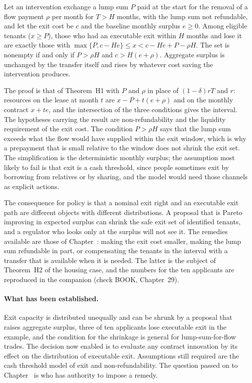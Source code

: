 \begin{proposition}\label{prop:P28gen}
Let an intervention exchange a lump sum $P$ paid at the start for the removal of a flow payment $\rho$ per month for $T>H$ months, with the lump sum not refundable, and let the exit cost be $c$ and the baseline monthly surplus $e\ge 0$. Among eligible tenants ($x\ge P$), those who had an executable exit within $H$ months and lose it are exactly those with $\max\{P,c-He\}\le x<c-He+P-\rho H$. The set is nonempty if and only if $P>\rho H$ and $c>H(e+\rho)$. Aggregate surplus is unchanged by the transfer itself and rises by whatever cost saving the intervention produces.
\end{proposition}

The proof is that of Theorem~H1 with $P$ and $\rho$ in place of $(1-\delta)rT$ and $r$: resources on the lease at month $t$ are $x-P+t(e+\rho)$ and on the monthly contract $x+te$, and the intersection of the three conditions gives the interval. The hypotheses carrying the result are non-refundability and the liquidity requirement of the exit cost. The condition $P>\rho H$ says that the lump sum exceeds what the flow would have supplied within the exit window, which is why a prepayment that is small relative to the window does not shrink the exit set. The simplification is the deterministic monthly surplus; the assumption most likely to fail is that exit is a cash threshold, since people sometimes exit by borrowing from relatives or by sharing, and the model would need those channels as explicit actions.

The consequence for policy is that a nominal exit right and an executable exit path are different objects with different distributions. A proposal that is Pareto improving in expected surplus can shrink the safe exit set of identified tenants, and a regulator who looks only at the surplus will not see it. The remedies available are those of Chapter~: making the exit cost smaller, making the lump sum refundable in part, or compensating the tenants in the interval with a transfer that is available when it is needed. The latter is the subject of Theorem~H2 of the housing case, and the numbers for the ten applicants are reproduced in the companion (check BOOK, Chapter~29).

\paragraph{What has been established.} Exit capacity is distributed unequally and can be shrunk by a proposal that raises aggregate surplus, three of ten applicants lose executable exit in the example, and the condition for the shrinkage is general for lump-sum-for-flow trades. The decision now enabled is to evaluate any contract innovation by its effect on the distribution of executable exit. Assumptions still required are the cash threshold model of exit and non-refundability. The question passed on to Chapter~ is who has authority to impose a remedy.

